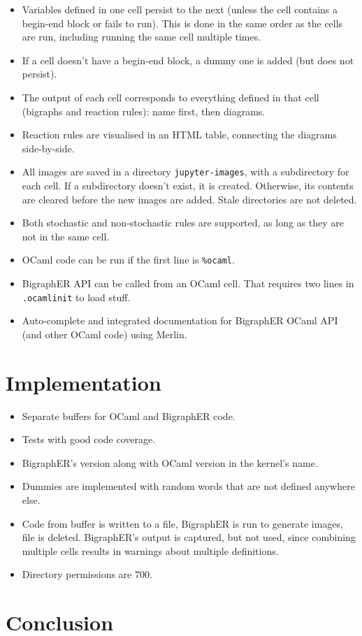 \documentclass{article}
\begin{document}
\begin{itemize}
\item Variables defined in one cell persist to the next (unless the cell
  contains a begin-end block or fails to run). This is done in the same order as
  the cells are run, including running the same cell multiple times.
\item If a cell doesn't have a begin-end block, a dummy one is added (but does
  not persist).
\item The output of each cell corresponds to everything defined in that cell
  (bigraphs and reaction rules): name first, then diagrams.
\item Reaction rules are visualised in an HTML table, connecting the diagrams
  side-by-side.
\item All images are saved in a directory \texttt{jupyter-images}, with a
  subdirectory for each cell. If a subdirectory doesn't exist, it is created.
  Otherwise, its contents are cleared before the new images are added. Stale
  directories are not deleted.
\item Both stochastic and non-stochastic rules are supported, as long as they
  are not in the same cell.
\item OCaml code can be run if the first line is \texttt{\%ocaml}.

\item BigraphER API can be called from an OCaml cell. That requires two lines in
  \texttt{.ocamlinit} to load stuff.
\item Auto-complete and integrated documentation for BigraphER OCaml API (and
  other OCaml code) using Merlin.
\end{itemize}

\section{Implementation}


\begin{itemize}
\item Separate buffers for OCaml and BigraphER code.
\item Tests with good code coverage.
\item BigraphER's version along with OCaml version in the kernel's name.
\item Dummies are implemented with random words that are not defined anywhere else.
\item Code from buffer is written to a file, BigraphER is run to generate
  images, file is deleted. BigraphER's output is captured, but not used, since
  combining multiple cells results in warnings about multiple definitions.
\item Directory permissions are $700$.
\end{itemize}

\section{Conclusion}
\end{document}
